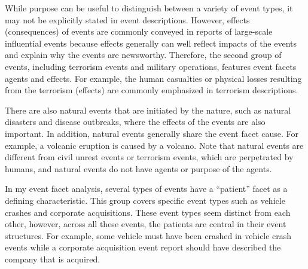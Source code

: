 While purpose can be useful to distinguish between a variety of event types, 
it may not be explicitly stated in event descriptions.
However, effects (consequences) of events are commonly conveyed in 
reports of large-scale influential events because effects generally 
can well reflect impacts of the events and explain why the events are newsworthy.
Therefore, the second group of events, including terrorism events and 
military operations, features event facets agents and effects. 
For example, 
the human casualties or physical losses resulting from the terrorism (effects) 
are commonly emphasized 
in terrorism descriptions. 

There are also natural events that are initiated by 
the 
nature, such as natural disasters and disease outbreaks, 
where the effects of the events are also important. 
In addition, natural events generally 
share the event facet cause. 
For example, 
a volcanic eruption is caused by a volcano.
Note that natural events are different from 
civil unrest events or terrorism events, which are perpetrated by 
humans, 
and natural events do not 
have agents or 
purpose of the agents. 

In my 
event facet analysis, 
several types of events 
have a ``patient'' facet as a defining characteristic. 
This group covers specific event types such as vehicle crashes and 
corporate acquisitions. 
These event types seem distinct from each other, however, 
across all these events, the patients
are central 
in their event structures. 
For example, some vehicle must have been crashed in vehicle crash events 
while a corporate acquisition event report 
should have described the company that is acquired. 

